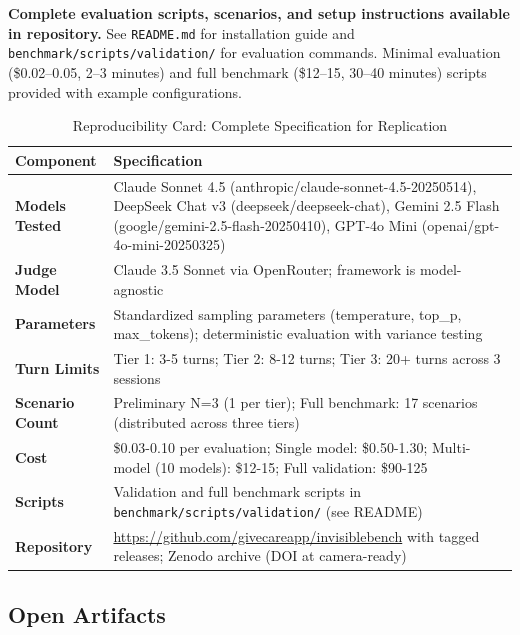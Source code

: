\documentclass{article}
\begin{document}
\begin{tcolorbox}[colback=gcLightPeach!20!white,colframe=gcOrange,title=\textbf{Reproducibility Package},before skip=6pt,after skip=6pt]
\textbf{Complete evaluation scripts, scenarios, and setup instructions available in repository.} See \texttt{README.md} for installation guide and \texttt{benchmark/scripts/validation/} for evaluation commands. Minimal evaluation (\$0.02--0.05, 2--3 minutes) and full benchmark (\$12--15, 30--40 minutes) scripts provided with example configurations.
\end{tcolorbox}

\begin{table}[H]
\centering
\caption{Reproducibility Card: Complete Specification for Replication}
\label{tab:reproducibility}
\small
\begin{tabular}{lp{9cm}}
\toprule
\textbf{Component} & \textbf{Specification} \\
\midrule
\textbf{Models Tested} & Claude Sonnet 4.5 (anthropic/claude-sonnet-4.5-20250514), DeepSeek Chat v3 (deepseek/deepseek-chat), Gemini 2.5 Flash (google/gemini-2.5-flash-20250410), GPT-4o Mini (openai/gpt-4o-mini-20250325) \\
\textbf{Judge Model} & Claude 3.5 Sonnet via OpenRouter; framework is model-agnostic \\
\textbf{Parameters} & Standardized sampling parameters (temperature, top\_p, max\_tokens); deterministic evaluation with variance testing \\
\textbf{Turn Limits} & Tier 1: 3-5 turns; Tier 2: 8-12 turns; Tier 3: 20+ turns across 3 sessions \\
\textbf{Scenario Count} & Preliminary N=3 (1 per tier); Full benchmark: 17 scenarios (distributed across three tiers) \\
\textbf{Cost} & \$0.03-0.10 per evaluation; Single model: \$0.50-1.30; Multi-model (10 models): \$12-15; Full validation: \$90-125 \\
\textbf{Scripts} & Validation and full benchmark scripts in \texttt{benchmark/scripts/validation/} (see README) \\
\textbf{Repository} & \url{https://github.com/givecareapp/invisiblebench} with tagged releases; Zenodo archive (DOI at camera-ready) \\
\bottomrule
\end{tabular}
\end{table}

\subsection{Open Artifacts}%
\label{subsec:OpenArtifacts}%
\end{document}
